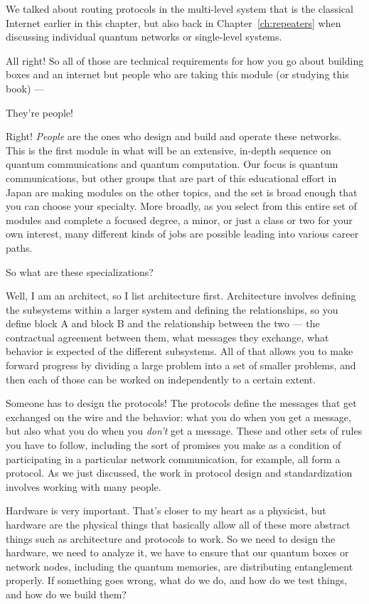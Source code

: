 \rrr We talked about routing protocols in the multi-level system that is the classical Internet earlier in this chapter, but also back in Chapter~\ref{ch:repeaters} when discussing individual quantum networks or single-level systems.

All right! So all of those are technical requirements for how you go about building boxes and an internet but people who are taking this module (or studying this book) ---

\mmm They're people! 

\rrr Right! \emph{People} are the ones who design and build and operate these networks. This is the first module in what will be an extensive, in-depth sequence on quantum communications and quantum computation.  Our focus is quantum communications, but other groups that are part of this educational effort in Japan are making modules on the other topics, and the set is broad enough that you can choose your specialty. More broadly, as you select from this entire set of modules and complete a focused degree, a minor, or just a class or two for your own interest, many different kinds of jobs are possible leading into various career paths.

\mmm So what are these specializations?

\rrr Well, I am an architect, so I list architecture first. Architecture involves defining the subsystems within a larger system and defining the relationships, so you define block A and block B and the relationship between the two --- the contractual agreement between them, what messages they exchange, what behavior is expected of the different subsystems. All of that allows you to make forward progress by dividing a large problem into a set of smaller problems, and then each of those can be worked on independently to a certain extent.

Someone has to design the protocols! The protocols define the messages that get exchanged on the wire and the behavior: what you do when you get a message, but also what you do when you \emph{don't} get a message. These and other sets of rules you have to follow, including the sort of promises you make as a condition of participating in a particular network communication, for example, all form a protocol.  As we just discussed, the work in protocol design and standardization involves working with many people.

\mmm Hardware is very important. That's closer to my heart as a physicist, but hardware are the physical things that basically allow all of these more abstract things such as architecture and protocols to work. So we need to design the hardware, we need to analyze it, we have to ensure that our quantum boxes or network nodes, including the quantum memories, are distributing entanglement properly. If something goes wrong, what do we do, and how do we test things, and how do we build them?

